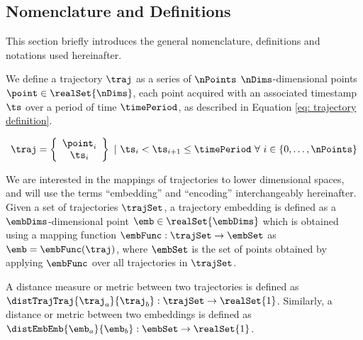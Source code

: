 \subsection{Nomenclature and Definitions}\label{subsec: nomenclature and definitions}

This section briefly introduces the general nomenclature, definitions and notations used hereinafter.

We define a trajectory $\traj$ as a series of $\nPoints$ $\nDims$-dimensional points $\point\in\realSet{\nDims}$, each point acquired with an associated timestamp $\ts$ over a period of time $\timePeriod$, as described in Equation \ref{eq: trajectory definition}.

\begin{equation}\label{eq: trajectory definition}
	\traj = 
	\left\{
	\begin{array}{c}
		\point_i \\
		\ts_i
	\end{array}
	\right\}
	~|~ \ts_i < \ts_{i+1} \leq \timePeriod ~\forall~ i \in \{0, \hdots, \nPoints\}
\end{equation}

We are interested in the mappings of trajectories to lower dimensional spaces, and will use the terms ``embedding'' and ``encoding'' interchangeably hereinafter.
%
Given a set of trajectories $\trajSet$, a trajectory embedding is defined as a $\embDims$-dimensional point $\emb\in\realSet{\embDims}$ which is obtained using a mapping function $\embFunc:\trajSet\rightarrow\embSet$ as $\emb = \embFunc(\traj)$, where $\embSet$ is the set of points obtained by applying $\embFunc$ over all trajectories in $\trajSet$.

A distance measure or metric between two trajectories is defined as $\distTrajTraj{\traj_a}{\traj_b}:\trajSet\rightarrow\realSet{1}$.
%
Similarly, a distance or metric between two embeddings is defined as $\distEmbEmb{\emb_a}{\emb_b}:\embSet\rightarrow\realSet{1}$.
